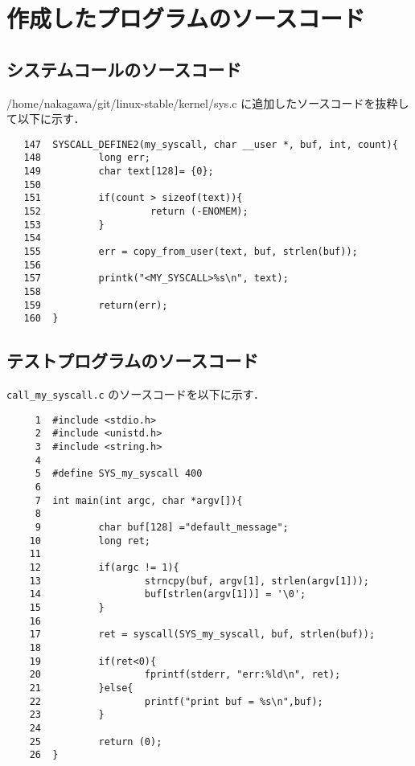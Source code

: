 \documentclass[12pt]{jsarticle}
\begin{document}
\section{作成したプログラムのソースコード}
\subsection{システムコールのソースコード}\label{sec:syscall}
 /home/nakagawa/git/linux-stable/kernel/sys.c に追加したソースコードを抜粋して以下に示す．
\begin{verbatim}
   147	SYSCALL_DEFINE2(my_syscall, char __user *, buf, int, count){
   148	        long err;
   149	        char text[128]= {0};
   150	
   151	        if(count > sizeof(text)){
   152	                 return (-ENOMEM);
   153	        }
   154	
   155	        err = copy_from_user(text, buf, strlen(buf));
   156	
   157	        printk("<MY_SYSCALL>%s\n", text);
   158	
   159	        return(err);
   160	}
\end{verbatim}
\subsection{テストプログラムのソースコード}\label{sec:test}
\verb|call_my_syscall.c| のソースコードを以下に示す．
\begin{verbatim}
     1	#include <stdio.h>
     2	#include <unistd.h>
     3	#include <string.h>
     4	
     5	#define SYS_my_syscall 400
     6	
     7	int main(int argc, char *argv[]){
     8	
     9	        char buf[128] ="default_message";
    10	        long ret;
    11	
    12	        if(argc != 1){
    13	                strncpy(buf, argv[1], strlen(argv[1]));
    14	                buf[strlen(argv[1])] = '\0';
    15	        }
    16	
    17	        ret = syscall(SYS_my_syscall, buf, strlen(buf));
    18	
    19	        if(ret<0){
    20	                fprintf(stderr, "err:%ld\n", ret);
    21	        }else{
    22	                printf("print buf = %s\n",buf);
    23	        }
    24	
    25	        return (0);
    26	}
\end{verbatim}

%
\end{document}

